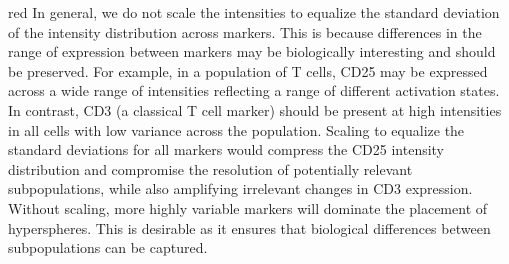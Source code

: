 \documentclass{article}
\begin{document}
\begin{color}{red}
In general, we do not scale the intensities to equalize the standard deviation of the intensity distribution across markers.
This is because differences in the range of expression between markers may be biologically interesting and should be preserved.
For example, in a population of T cells, CD25 may be expressed across a wide range of intensities reflecting a range of different activation states.
In contrast, CD3 (a classical T cell marker) should be present at high intensities in all cells with low variance across the population.
Scaling to equalize the standard deviations for all markers would compress the CD25 intensity distribution and compromise the resolution of potentially relevant subpopulations, while also amplifying irrelevant changes in CD3 expression.
Without scaling, more highly variable markers will dominate the placement of hyperspheres.
This is desirable as it ensures that biological differences between subpopulations can be captured. 
\end{color}
\end{document}
